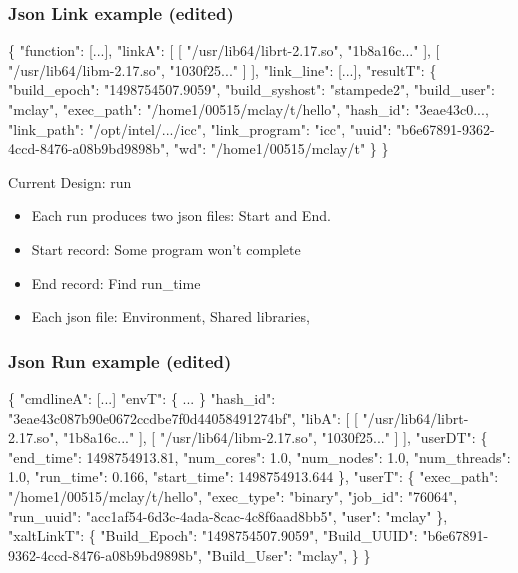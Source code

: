 \documentclass{beamer}
\begin{document}
\begin{frame}[fragile]
    \frametitle{Json Link example (edited)}
    {\tiny
\begin{semiverbatim}
\{
    "function": [...],
    "linkA": [
        [ "/usr/lib64/librt-2.17.so", "1b8a16c..."  ],
        [ "/usr/lib64/libm-2.17.so",  "1030f25..."  ]
    ],
    "link_line": [...],
    "resultT": \{
        "build_epoch": "1498754507.9059",
        "build_syshost": "stampede2",
        "build_user": "mclay",
        "exec_path": "/home1/00515/mclay/t/hello",
        "hash_id": "3eae43c0...,
        "link_path": "/opt/intel/.../icc",
        "link_program": "icc",
        "uuid": "b6e67891-9362-4ccd-8476-a08b9bd9898b",
        "wd": "/home1/00515/mclay/t"
    \}
\}
\end{semiverbatim}
    }
\end{frame}

\begin{frame}{Current Design: run}
  \begin{itemize}
    \item Each run produces two json files: Start and End.
    \item Start record: Some program won't complete
    \item End record: Find run\_time
    \item Each json file: Environment, Shared libraries,
  \end{itemize}
\end{frame}

\begin{frame}[fragile]
    \frametitle{Json Run example (edited)}
    {\tiny
\begin{semiverbatim}
\{
    "cmdlineA": [...]
    "envT": \{ ... \}
    "hash_id": "3eae43c087b90e0672ccdbe7f0d44058491274bf",
    "libA": [
        [ "/usr/lib64/librt-2.17.so", "1b8a16c..."  ],
        [ "/usr/lib64/libm-2.17.so",  "1030f25..."  ]
    ],
    "userDT": \{
        "end_time": 1498754913.81,
        "num_cores": 1.0,
        "num_nodes": 1.0,
        "num_threads": 1.0,
        "run_time": 0.166,
        "start_time": 1498754913.644
    \},
    "userT": \{
        "exec_path": "/home1/00515/mclay/t/hello",
        "exec_type": "binary",
        "job_id": "76064",
        "run_uuid": "acc1af54-6d3c-4ada-8cac-4c8f6aad8bb5",
        "user": "mclay"
    \},
    "xaltLinkT": \{
        "Build_Epoch": "1498754507.9059",
        "Build_UUID": "b6e67891-9362-4ccd-8476-a08b9bd9898b",
        "Build_User": "mclay",
    \}
\}
\end{semiverbatim}
    }
\end{frame}
\end{document}
